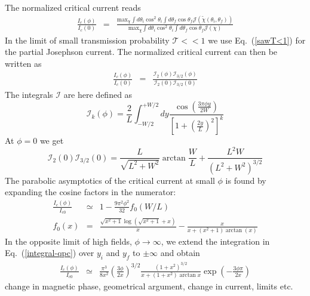 The normalized critical current reads
\begin{eqnarray}
\frac{I_c(\phi)}{I_c(0)} &=& \frac{ \text{max}_{\chi} \int d \theta_i \cos^2 \theta_i\int d \theta_f \cos \theta_f \mathcal{J}(\tilde{\chi}(\theta_i, \theta_f)) }{ \text{max}_{\chi} \int d \theta_i \cos^2 \theta_i\int d \theta_f \cos \theta_f \mathcal{J}(\chi) }
\end{eqnarray}
In the limit of small transmission probability $\mathcal{T} << 1$ we use Eq.~(\ref{sawT<1}) for the partial Josephson current. The normalized critical current can then be written as 
\begin{eqnarray}
\frac{I_c(\phi)}{I_c(0)} &=& \frac{\mathcal{I}_2(\phi)\mathcal{I}_{3/2}(\phi)}{\mathcal{I}_2(0)\mathcal{I}_{3/2}(0)}
\end{eqnarray}
The integrals $\mathcal{I}$ are here defined as
\begin{equation}
\mathcal{I}_k(\phi) = \frac{2}{L}\int_{-W/2}^{+W/2}dy \frac{\cos\left(\frac{3\pi\phi y}{2W}\right)}{\left[1 + \left(\frac{2y}{L}\right)^2 \right]^k}
\label{integral-qpc}
\end{equation}
At $\phi=0$ we get
\begin{equation}
\mathcal{I}_2(0)\mathcal{I}_{3/2}(0) =
\frac{L}{\sqrt{L^2+W^2}}\arctan\frac{W}{L} + \frac{L^2W}{(L^2+W^2)^{3/2}}
\label{Ic-0}
\end{equation}
The parabolic asymptotics of the critical current at small $\phi$ is found by expanding
the cosine factors in the numerator:
\begin{eqnarray}
\frac{I_c(\phi)}{I_{c0}}&\simeq& 1 - \frac{9\pi ^2 \phi^2 }{32} f_0(W/L) \\
f_0(x) &=& \frac{\sqrt{x^2+1} \log \left(\sqrt{x^2+1}+x\right)}{x}- \frac{x}{x+\left(x^2+1\right) \arctan(x)} 
\end{eqnarray}
In the opposite limit of high fields, $\phi\to \infty$, we extend the integration in Eq.~(\ref{integral-qpc}) over $y_i$ and $y_f$ to $\pm \infty$ and obtain
\begin{eqnarray}
\frac{I_c(\phi)}{I_{c0}} &\simeq& \frac{\pi^3 }{8x^2}\left(\frac{3\phi}{2x}\right)^{3/2}\frac{\left(1+x^2\right)^{3/2}}{x + \left(1+x^2\right)\arctan x}\exp\left(-\frac{3\phi\pi}{2x}\right)
\label{large-phi}
\end{eqnarray}
change in magnetic phase, geometrical argument, change in current, limits etc. 





